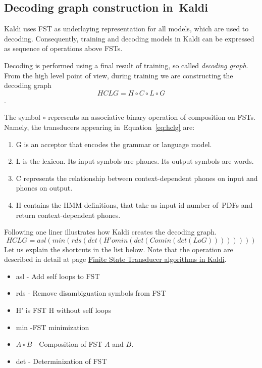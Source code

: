 \subsection{Decoding graph construction in~Kaldi} %
Kaldi uses \ac{FST} as underlaying representation for all models, which are used to decoding. Consequently, 
training and decoding models in Kaldi can be expressed as sequence of operations above \acp{FST}.

Decoding is performed using a final result of training, so called {\it decoding graph}. 
From the high level point of view,
during training we are constructing the decoding graph 
\begin{equation} \label{eq:hclg}
HCLG = H\circ C\circ L\circ G
\end{equation}.

The symbol $\circ$ represents an associative binary operation of composition on \acp{FST}.
Namely, the transducers appearing in~Equation~\ref{eq:hclg} are:
\begin{enumerate}
    \item G is an acceptor that encodes the grammar or language model.
    \item L is the lexicon. Its input symbols are phones. Its output symbols are words.
    \item C represents the relationship between context-dependent phones on input and phones on output.
    \item H contains the \ac{HMM} definitions, that take as input id number of~\acp{PDF} and return context-dependent phones.
\end{enumerate}

Following one liner illustrates how Kaldi creates the decoding graph. 
\begin{equation}
   HCLG = asl(min(rds(det(H' o min(det(C o min(det(L o G)))))))) 
\end{equation}
Let us explain the shortcuts in the list below. Note that the operation are described in detail
at page \href{http://kaldi.sourceforge.net/fst_algo.html#fst_algo_stochastic} {Finite State Transducer algorithms in Kaldi}. 
\begin{itemize}
    \item asl - Add self loops to \ac{FST}
    \item rds - Remove disambiguation symbols from \ac{FST}
    \item H' is \ac{FST} H without self loops
    \item min -\ac{FST} minimization
    \item $A\circ B$  - Composition of \ac{FST} $A$ and $B$.
    \item det - Determinization of \ac{FST}
\end{itemize}

